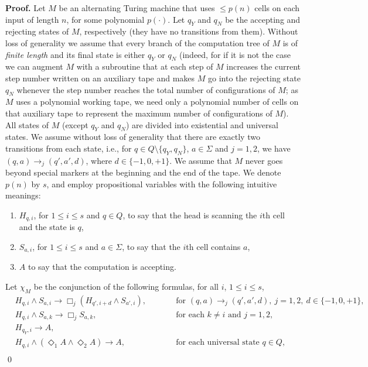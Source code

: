 \documentclass{LMCS}
\renewenvironment{proof}{\par\noindent\textbf{Proof.}}{\mbox{}\qed\par\medskip}
\theoremstyle{plain}
\begin{document}
\begin{proof}
Let $M$ be an alternating Turing machine that uses $\leq p(n)$ cells
on each input of length $n$, for some polynomial $p(\cdot)$. Let $q_Y$
and $q_N$ be the accepting and rejecting states of $M$, respectively
(they have no transitions from them). Without loss of generality we
assume that every branch of the computation tree of $M$ is of
\emph{finite length} and its final state is either $q_Y$ or $q_N$
(indeed, for if it is not the case we can augment $M$ with a subroutine
that at each step of $M$ increases the current step number written on
an auxiliary tape and makes $M$ go into the rejecting state $q_N$
whenever the step number reaches the total number of configurations of
$M$; as $M$ uses a polynomial working tape, we need only a polynomial
number of cells on that auxiliary tape to represent the maximum number
of configurations of $M$). All states of $M$ (except $q_Y$ and $q_N$)
are divided into existential and universal states. We assume without
loss of generality that there are exactly two transitions from each
state, i.e., for $q\in Q\setminus\{q_Y,q_N\}$, $a\in\Sigma$ and $j =
1,2$, we have $(q,a)\to_j (q',a',d)$, where $d \in \{-1,0,+1\}$.  We
assume that $M$ never goes beyond special markers at the beginning and
the end of the tape. We denote $p(n)$ by $s$, and
employ propositional variables with the following intuitive meanings:
\begin{enumerate}[$\bullet$]
\item $H_{q,i}$, for $1 \leq i \leq s$ and $q\in Q$, to say that the head
is scanning
the $i$th cell and the state is $q$,
\item $S_{a,i}$, for $1 \leq i \leq s$ and $a\in \Sigma$, to say that the $i$th cell contains $a$,
\item $A$ to say that the computation is accepting.
\end{enumerate}
Let $\chi_M$ be the conjunction of the following formulas, for all $i$, $1 \leq i \leq s$,
\begin{align*}
& H_{q,i} \land S_{a,i} \to \Box_j (H_{q', i+d} \land S_{a',i}), \qquad&&\text{for } (q,a)\to_j (q',a',d), \ j = 1,2, \ d\in \{-1,0,+1\},\\
& H_{q,i} \land S_{a,k} \to \Box_j S_{a,k}, \qquad&&\text{for each } k \ne i \text{ and }  j = 1,2,\\
& H_{q_Y,i} \to A,\\
& H_{q,i} \land (\Diamond_1 A \land \Diamond_2 A) \to A,&&\text{for each universal state }q\in Q,\\

\end{align*}
\end{proof}
\end{document}
